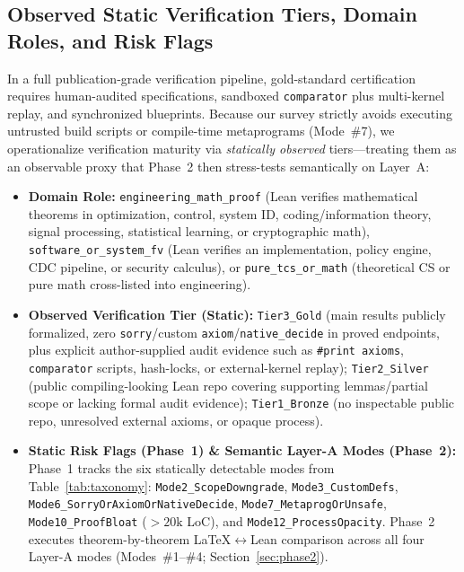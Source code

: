 \documentclass[11pt,letterpaper]{article}
\begin{document}
\subsection{Observed Static Verification Tiers, Domain Roles, and Risk Flags}
In a full publication-grade verification pipeline, gold-standard certification requires human-audited specifications, sandboxed \texttt{comparator} plus multi-kernel replay, and synchronized blueprints. Because our survey strictly avoids executing untrusted build scripts or compile-time metaprograms (Mode~\#7), we operationalize verification maturity via \emph{statically observed} tiers---treating them as an observable proxy that Phase~2 then stress-tests semantically on Layer~A:
\begin{itemize}
  \item \textbf{Domain Role:} \texttt{engineering\_math\_proof} (Lean verifies mathematical theorems in optimization, control, system ID, coding/information theory, signal processing, statistical learning, or cryptographic math), \texttt{software\_or\_system\_fv} (Lean verifies an implementation, policy engine, CDC pipeline, or security calculus), or \texttt{pure\_tcs\_or\_math} (theoretical CS or pure math cross-listed into engineering).
  \item \textbf{Observed Verification Tier (Static):} \texttt{Tier3\_Gold} (main results publicly formalized, zero \texttt{sorry}/custom \texttt{axiom}/\texttt{native\_decide} in proved endpoints, plus explicit author-supplied audit evidence such as \texttt{\#print axioms}, \texttt{comparator} scripts, hash-locks, or external-kernel replay); \texttt{Tier2\_Silver} (public compiling-looking Lean repo covering supporting lemmas/partial scope or lacking formal audit evidence); \texttt{Tier1\_Bronze} (no inspectable public repo, unresolved external axioms, or opaque process).
  \item \textbf{Static Risk Flags (Phase~1) \& Semantic Layer-A Modes (Phase~2):} Phase~1 tracks the six statically detectable modes from Table~\ref{tab:taxonomy}: \texttt{Mode2\_ScopeDowngrade}, \texttt{Mode3\_CustomDefs}, \texttt{Mode6\_SorryOrAxiomOrNativeDecide}, \texttt{Mode7\_MetaprogOrUnsafe}, \texttt{Mode10\_ProofBloat} ($>20\text{k}$ LoC), and \texttt{Mode12\_ProcessOpacity}. Phase~2 executes theorem-by-theorem \LaTeX{}$\leftrightarrow$Lean comparison across all four Layer-A modes (Modes~\#1--\#4; Section~\ref{sec:phase2}).
\end{itemize}

\end{document}
